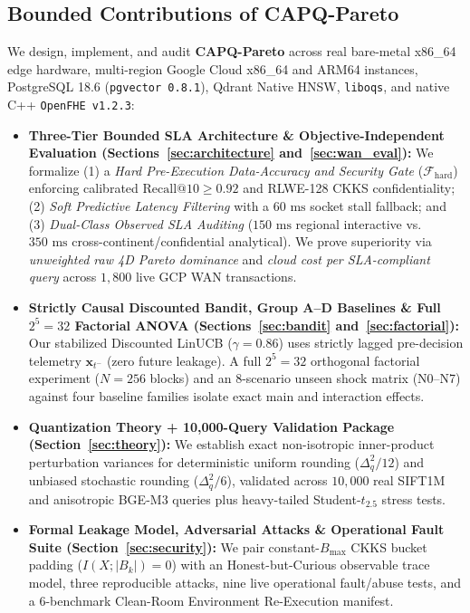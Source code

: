 \documentclass[10pt,journal,compsoc]{IEEEtran}
\begin{document}
\subsection{Bounded Contributions of CAPQ-Pareto}
We design, implement, and audit \textbf{CAPQ-Pareto} across real bare-metal x86\_64 edge hardware, multi-region Google Cloud x86\_64 and ARM64 instances, PostgreSQL 18.6 (\texttt{pgvector 0.8.1}), Qdrant Native HNSW, \texttt{liboqs}, and native C++ \texttt{OpenFHE v1.2.3}:
\begin{itemize}
    \item \textbf{Three-Tier Bounded SLA Architecture \& Objective-Independent Evaluation (Sections~\ref{sec:architecture} and~\ref{sec:wan_eval}):} We formalize (1) a \emph{Hard Pre-Execution Data-Accuracy and Security Gate} ($\mathcal{F}_{\text{hard}}$) enforcing calibrated $\text{Recall@10} \ge 0.92$ and RLWE-128 CKKS confidentiality; (2) \emph{Soft Predictive Latency Filtering} with a $60\text{ ms}$ socket stall fallback; and (3) \emph{Dual-Class Observed SLA Auditing} ($150\text{ ms}$ regional interactive vs. $350\text{ ms}$ cross-continent/confidential analytical). We prove superiority via \emph{unweighted raw 4D Pareto dominance} and \emph{cloud cost per SLA-compliant query} across $1,800$ live GCP WAN transactions.
    \item \textbf{Strictly Causal Discounted Bandit, Group A--D Baselines \& Full $2^5=32$ Factorial ANOVA (Sections~\ref{sec:bandit} and~\ref{sec:factorial}):} Our stabilized Discounted LinUCB ($\gamma=0.86$) uses strictly lagged pre-decision telemetry $\mathbf{x}_{t^-}$ (zero future leakage). A full $2^5=32$ orthogonal factorial experiment ($N=256$ blocks) and an 8-scenario unseen shock matrix (N0--N7) against four baseline families isolate exact main and interaction effects.
    \item \textbf{Quantization Theory + 10,000-Query Validation Package (Section~\ref{sec:theory}):} We establish exact non-isotropic inner-product perturbation variances for deterministic uniform rounding ($\Delta_q^2/12$) and unbiased stochastic rounding ($\Delta_q^2/6$), validated across $10,000$ real SIFT1M and anisotropic BGE-M3 queries plus heavy-tailed Student-$t_{2.5}$ stress tests.
    \item \textbf{Formal Leakage Model, Adversarial Attacks \& Operational Fault Suite (Section~\ref{sec:security}):} We pair constant-$B_{\max}$ CKKS bucket padding ($I(X;|B_k|)=0$) with an Honest-but-Curious observable trace model, three reproducible attacks, nine live operational fault/abuse tests, and a 6-benchmark Clean-Room Environment Re-Execution manifest.
\end{itemize}
\end{document}
